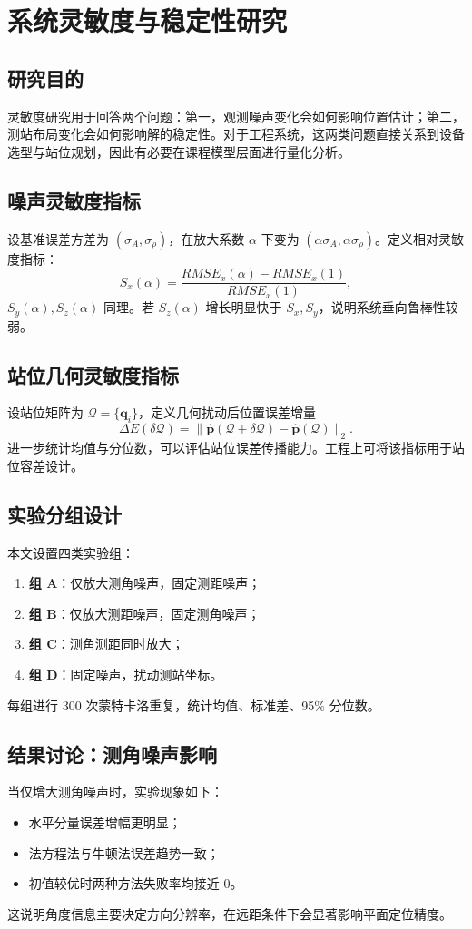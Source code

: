 \chapter{系统灵敏度与稳定性研究}

\section{研究目的}
灵敏度研究用于回答两个问题：第一，观测噪声变化会如何影响位置估计；第二，测站布局变化会如何影响解的稳定性。对于工程系统，这两类问题直接关系到设备选型与站位规划，因此有必要在课程模型层面进行量化分析。

\section{噪声灵敏度指标}
设基准误差方差为 $(\sigma_A,\sigma_\rho)$，在放大系数 $\alpha$ 下变为 $(\alpha\sigma_A,\alpha\sigma_\rho)$。定义相对灵敏度指标：
\[
S_x(\alpha)=\frac{RMSE_x(\alpha)-RMSE_x(1)}{RMSE_x(1)},
\]
$S_y(\alpha),S_z(\alpha)$ 同理。若 $S_z(\alpha)$ 增长明显快于 $S_x,S_y$，说明系统垂向鲁棒性较弱。

\section{站位几何灵敏度指标}
设站位矩阵为 $\mathcal Q=\{\bm q_i\}$，定义几何扰动后位置误差增量
\[
\Delta E(\delta\mathcal Q)=
\|\hat{\bm p}(\mathcal Q+\delta\mathcal Q)-\hat{\bm p}(\mathcal Q)\|_2.
\]
进一步统计均值与分位数，可以评估站位误差传播能力。工程上可将该指标用于站位容差设计。

\section{实验分组设计}
本文设置四类实验组：
\begin{enumerate}
  \item \textbf{组 A}：仅放大测角噪声，固定测距噪声；
  \item \textbf{组 B}：仅放大测距噪声，固定测角噪声；
  \item \textbf{组 C}：测角测距同时放大；
  \item \textbf{组 D}：固定噪声，扰动测站坐标。
\end{enumerate}
每组进行 300 次蒙特卡洛重复，统计均值、标准差、95\% 分位数。

\section{结果讨论：测角噪声影响}
当仅增大测角噪声时，实验现象如下：
\begin{itemize}
  \item 水平分量误差增幅更明显；
  \item 法方程法与牛顿法误差趋势一致；
  \item 初值较优时两种方法失败率均接近 0。
\end{itemize}
这说明角度信息主要决定方向分辨率，在远距条件下会显著影响平面定位精度。


